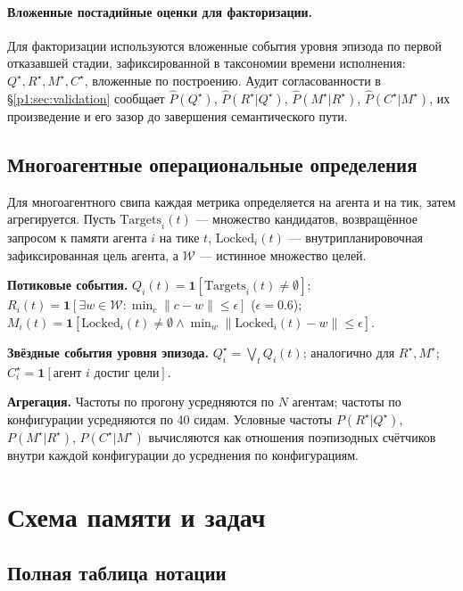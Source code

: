 \documentclass{article}
\begin{document}
\paragraph{Вложенные постадийные оценки для факторизации.}
Для факторизации используются вложенные события уровня эпизода по первой отказавшей стадии, зафиксированной в таксономии времени исполнения: $Q^\star, R^\star, M^\star, C^\star$, вложенные по построению. Аудит согласованности в \S\ref{p1:sec:validation} сообщает $\hat P(Q^\star)$, $\hat P(R^\star|Q^\star)$, $\hat P(M^\star|R^\star)$, $\hat P(C^\star|M^\star)$, их произведение и его зазор до завершения семантического пути.

\subsection{Многоагентные операциональные определения}
\label{p1:app:multi-agent-defs}

Для многоагентного свипа каждая метрика определяется на агента и на тик, затем агрегируется. Пусть $\mathrm{Targets}_i(t)$ --- множество кандидатов, возвращённое запросом к памяти агента $i$ на тике $t$, $\mathrm{Locked}_i(t)$ --- внутрипланировочная зафиксированная цель агента, а $\mathcal{W}$ --- истинное множество целей.

\textbf{Потиковые события.} $Q_i(t) = \mathbf{1}[\mathrm{Targets}_i(t) \ne \emptyset]$; $R_i(t) = \mathbf{1}[\exists w \in \mathcal{W}: \min_{c}\|c - w\| \le \epsilon]$ ($\epsilon = 0.6$); $M_i(t) = \mathbf{1}[\mathrm{Locked}_i(t) \ne \emptyset \land \min_w\|\mathrm{Locked}_i(t) - w\| \le \epsilon]$.

\textbf{Звёздные события уровня эпизода.} $Q^\star_i = \bigvee_t Q_i(t)$; аналогично для $R^\star, M^\star$; $C^\star_i = \mathbf{1}[\text{агент } i \text{ достиг цели}]$.

\textbf{Агрегация.} Частоты по прогону усредняются по $N$ агентам; частоты по конфигурации усредняются по 40 сидам. Условные частоты $P(R^\star|Q^\star)$, $P(M^\star|R^\star)$, $P(C^\star|M^\star)$ вычисляются как отношения поэпизодных счётчиков внутри каждой конфигурации до усреднения по конфигурациям.

\section{Схема памяти и задач}
\label{p1:app:schemas}

\subsection{Полная таблица нотации}
\label{p1:app:notation}
\end{document}
